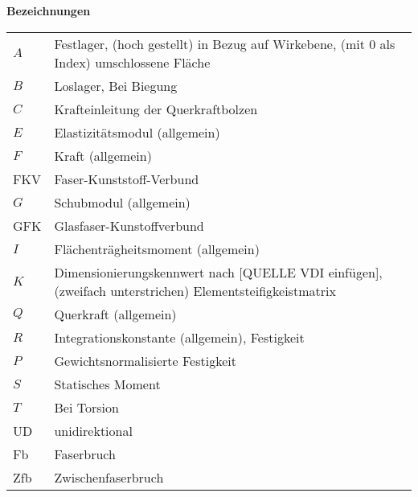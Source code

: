 \textbf{Bezeichnungen}
\begin{table}[h]

\begin{tabular}{ll}
	$ A $&Festlager, (hoch gestellt) in Bezug auf Wirkebene, (mit 0 als Index) umschlossene Fläche\\
	$ B $&Loslager, Bei Biegung\\
	$ C $&Krafteinleitung der Querkraftbolzen\\
	$ E $&Elastizitätsmodul (allgemein)\\
	$ F $&Kraft (allgemein)\\
	FKV&Faser-Kunststoff-Verbund\\
	$ G $&Schubmodul (allgemein)\\
	GFK& Glasfaser-Kunstoffverbund\\
	$ I $&Flächenträgheitsmoment (allgemein)\\
	$ K $&Dimensionierungskennwert nach [QUELLE VDI einfügen], (zweifach unterstrichen) Elementsteifigkeistmatrix\\
	$ Q $&Querkraft (allgemein)\\
	$ R $&Integrationskonstante (allgemein), Festigkeit\\
	$ P $&Gewichtsnormalisierte Festigkeit\\
	$ S $&Statisches Moment\\
	$ T $&Bei Torsion\\
	UD&unidirektional\\
	Fb&Faserbruch\\
	Zfb&Zwischenfaserbruch\\
	
\end{tabular}
\end{table}

